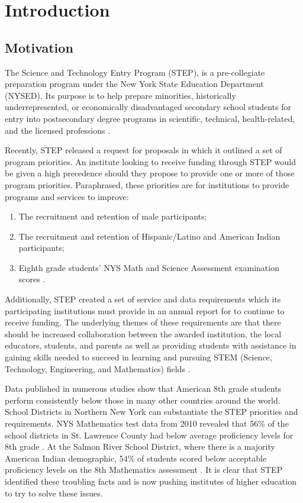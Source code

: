 \chapter{Introduction}
\label{chap:introduction}

\section{Motivation}
\label{sec:motivation}

The Science and Technology Entry Program (STEP), is a pre-collegiate preparation program under the New York State Education Department (NYSED). Its purpose is to help prepare minorities, historically underrepresented, or economically disadvantaged secondary school students for entry into postsecondary degree programs in scientific, technical, health-related, and the licensed professions \cite{nysed-step-website}.

Recently, STEP released a request for proposals in which it outlined a set of program priorities. An institute looking to receive funding through STEP would be given a high precedence should they propose to provide one or more of those program priorities. Paraphrased, these priorities are for institutions to provide programs and services to improve:
\begin{enumerate}
	\item The recruitment and retention of male participants;
	\item The recruitment and retention of Hispanic/Latino and American Indian participants;
	\item Eighth grade students' NYS Math and Science Assessment examination scores \cite{nys-step-op-manual}.
\end{enumerate}

Additionally, STEP created a set of service and data requirements which its participating institutions must provide in an annual report for to continue to receive funding. The underlying themes of these requirements are that there should be increased collaboration between the awarded institution, the local educators, students, and parents as well as providing students with assistance in gaining skills needed to succeed in learning and pursuing STEM (Science, Technology, Engineering, and Mathematics) fields \cite{nys-step-op-manual}.

Data published in numerous studies \cite{timms-95, before-its-too-late} show that American 8th grade students perform consistently below those in many other countries around the world. School Districts in Northern New York can substantiate the STEP priorities and requirements. NYS Mathematics test data from 2010 revealed that 56\% of the school districts in St. Lawrence County had below average proficiency levels for 8th grade \cite{step-application-11}. At the Salmon River School District, where there is a majority American Indian demographic, 54\% of students scored below acceptable proficiency levels on the 8th Mathematics assessment \cite{nny-prism}. It is clear that STEP identified these troubling facts and is now pushing institutes of higher education to try to solve these issues.

